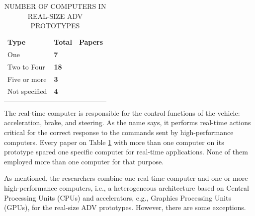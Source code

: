 \documentclass[lettersize,journal]{IEEEtran}
\begin{document}
\begin{table}[!ht]
  \centering
  \captionsetup{
    format=hang,
    justification=raggedright,
    singlelinecheck=false,
    skip=9pt,
  }
  \caption{\MakeUppercase{Number of Computers in Real-Size ADV Prototypes}}
  \label{table:hardware}
  \def\arraystretch{1.5}
  \begin{tabularx}{\textwidth}{>{\raggedright\arraybackslash}p{2.0cm}>{\centering\arraybackslash}p{0.7cm}X}
    \arrayrulecolor{white}
    \rowcolor{white}
    \textbf{Type} & \textbf{Total} & \textbf{Papers} \\
    \arrayrulecolor{cor_tabela} \hline
    \rule{0pt}{5.5ex}One & \cellcolor{cor_tabela}\textbf{7} & \cellcolor{cor_tabela}\cite{Kato2015,Bojarski2016,Zong2018,Belcarz2018,valera2019design,ORJUELA202015161,electronics10192447} \\
    \arrayrulecolor{cor_tabela} \hline
    \rule{0pt}{5.5ex}Two to Four & \cellcolor{cor_tabela}\textbf{18} & \cellcolor{cor_tabela}\cite{Kunz2015,Broggi2015a,Martin2016,Belbachir2017,Tas2018a,Munir2018,Aramrattana2018,Xu2018,Tang2018,Kessler2019,Betz2019,Marin-Plaza2019,Buyval2019,Reke2020,Angel2020,el2020,9359043,app11167225} \\
    \arrayrulecolor{cor_tabela} \hline
    \rule{0pt}{5.5ex}Five or more & \cellcolor{cor_tabela}\textbf{3} & \cellcolor{cor_tabela}\cite{Jo2015,Broggi2015,Buechel2015} \\
    \arrayrulecolor{cor_tabela} \hline
    \rule{0pt}{5.5ex}Not specified & \cellcolor{cor_tabela}\textbf{4} & \cellcolor{cor_tabela}\cite{Gupta2015,buchegger2018,9544320,9977411} \\
    \arrayrulecolor{cor_tabela} \hline
  \end{tabularx}
\end{table}



The real-time computer is responsible for the control functions of the vehicle: acceleration, brake, and steering. As the name says, it performs real-time actions critical for the correct response to the commands sent by high-performance computers. Every paper on Table \ref{table:hardware} with more than one computer on its prototype spared one specific computer for real-time applications. None of them employed more than one computer for that purpose.

As mentioned, the researchers combine one real-time computer and one or more high-performance computers, i.e., a heterogeneous architecture based on Central Processing Units (CPUs) and accelerators, e.g., Graphics Processing Units (GPUs), for the real-size ADV prototypes. However, there are some exceptions.
\end{document}
